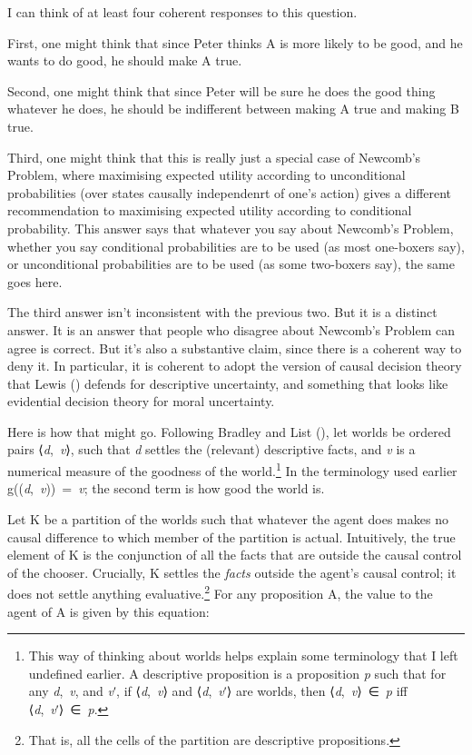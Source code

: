 \documentclass[
  11pt,
  letterpaper,
  DIV=11,
  numbers=noendperiod,
  twoside]{scrartcl}
\begin{document}
I can think of at least four coherent responses to this question.

First, one might think that since Peter thinks A is more likely to be
good, and he wants to do good, he should make A true.

Second, one might think that since Peter will be sure he does the good
thing whatever he does, he should be indifferent between making A true
and making B true.

Third, one might think that this is really just a special case of
Newcomb's Problem, where maximising expected utility according to
unconditional probabilities (over states causally independenrt of one's
action) gives a different recommendation to maximising expected utility
according to conditional probability. This answer says that whatever you
say about Newcomb's Problem, whether you say conditional probabilities
are to be used (as most one-boxers say), or unconditional probabilities
are to be used (as some two-boxers say), the same goes here.

The third answer isn't inconsistent with the previous two. But it is a
distinct answer. It is an answer that people who disagree about
Newcomb's Problem can agree is correct. But it's also a substantive
claim, since there is a coherent way to deny it. In particular, it is
coherent to adopt the version of causal decision theory that Lewis
() defends for descriptive uncertainty,
and something that looks like evidential decision theory for moral
uncertainty.

Here is how that might go. Following Bradley and List
(), let worlds be ordered pairs
⟨\emph{d},~\emph{v}⟩, such that \emph{d} settles the (relevant)
descriptive facts, and \emph{v} is a numerical measure of the goodness
of the world.\footnote{This way of thinking about worlds helps explain
  some terminology that I left undefined earlier. A descriptive
  proposition is a proposition \emph{p} such that for any
  \emph{d},~\emph{v}, and \emph{v}ʹ, if ⟨\emph{d},~\emph{v}⟩ and
  ⟨\emph{d},~\emph{v}ʹ⟩ are worlds, then ⟨\emph{d},~\emph{v}⟩~∈~\emph{p}
  iff ⟨\emph{d},~\emph{v}ʹ⟩~∈~\emph{p}.} In the terminology used earlier
g((\emph{d},~\emph{v}))~=~\emph{v}; the second term is how good the
world is.

Let K be a partition of the worlds such that whatever the agent does
makes no causal difference to which member of the partition is actual.
Intuitively, the true element of K is the conjunction of all the facts
that are outside the causal control of the chooser. Crucially, K settles
the \emph{facts} outside the agent's causal control; it does not settle
anything evaluative.\footnote{That is, all the cells of the partition
  are descriptive propositions.} For any proposition A, the value to the
agent of A is given by this equation:
\end{document}
